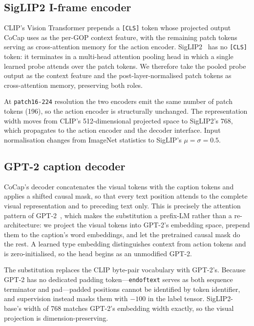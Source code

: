 \documentclass[10pt,twocolumn,letterpaper]{article}
\begin{document}
\subsection{SigLIP2 I-frame encoder}
\label{sec:siglip}

CLIP's Vision Transformer prepends a \texttt{[CLS]} token whose projected output CoCap uses as
the per-GOP context feature, with the remaining patch tokens serving as cross-attention memory
for the action encoder. SigLIP2~\cite{siglip2} has no \texttt{[CLS]} token: it terminates in a
multi-head attention pooling head in which a single learned probe attends over the patch tokens.
We therefore take the pooled probe output as the context feature and the post-layer-normalised
patch tokens as cross-attention memory, preserving both roles.

At \texttt{patch16-224} resolution the two encoders emit the same number of patch tokens (196),
so the action encoder is structurally unchanged. The representation width moves from CLIP's
512-dimensional projected space to SigLIP2's 768, which propagates to the action encoder and the
decoder interface. Input normalisation changes from ImageNet statistics to SigLIP's
$\mu = \sigma = 0.5$.

\subsection{GPT-2 caption decoder}
\label{sec:gpt2}

CoCap's decoder concatenates the visual tokens with the caption tokens and applies a shifted
causal mask, so that every text position attends to the complete visual representation and to
preceding text only. This is precisely the attention pattern of GPT-2~\cite{gpt2}, which makes
the substitution a prefix-LM rather than a re-architecture: we project the visual tokens into GPT-2's
embedding space, prepend them to the caption's word embeddings, and let the pretrained causal
mask do the rest. A learned type embedding distinguishes context from action tokens and is
zero-initialised, so the head begins as an unmodified GPT-2.

The substitution replaces the CLIP byte-pair vocabulary with GPT-2's. Because GPT-2 has no
dedicated padding token---\texttt{endoftext} serves as both sequence terminator and
pad---padded positions cannot be identified by token identifier, and supervision instead masks
them with $-100$ in the label tensor. SigLIP2-base's width of 768 matches GPT-2's embedding width
exactly, so the visual projection is dimension-preserving.
\end{document}
